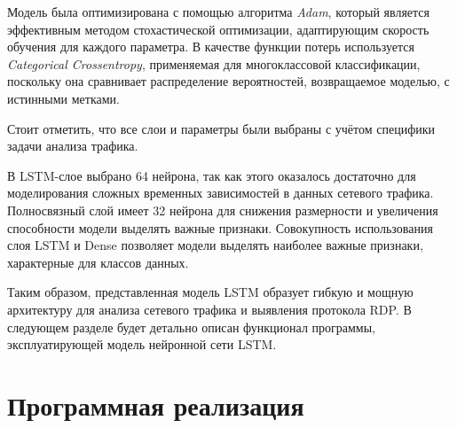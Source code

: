 \documentclass[bachelor, och, coursework]{SCWorks}
\begin{document}
Модель была оптимизирована с помощью алгоритма \textit{Adam}, который является эффективным методом стохастической оптимизации, адаптирующим скорость 
обучения для каждого параметра. В качестве функции потерь используется \textit{Categorical Crossentropy}, применяемая для многоклассовой классификации, 
поскольку она сравнивает распределение вероятностей, возвращаемое моделью, с истинными метками.

Стоит отметить, что все слои и параметры были выбраны с учётом специфики задачи анализа трафика.

В LSTM-слое выбрано 64 нейрона, так как этого оказалось достаточно для моделирования сложных временных зависимостей в данных сетевого трафика. Полносвязный 
слой имеет 32 нейрона для снижения размерности и увеличения способности модели выделять важные признаки. Совокупность использования слоя LSTM и Dense 
позволяет модели выделять наиболее важные признаки, характерные для классов данных.

Таким образом, представленная модель LSTM образует гибкую и мощную архитектуру для анализа сетевого трафика и выявления протокола RDP. В следующем 
разделе будет детально описан функционал программы, эксплуатирующей модель нейронной сети LSTM. 
  

\section{Программная реализация}


  
\end{document}
